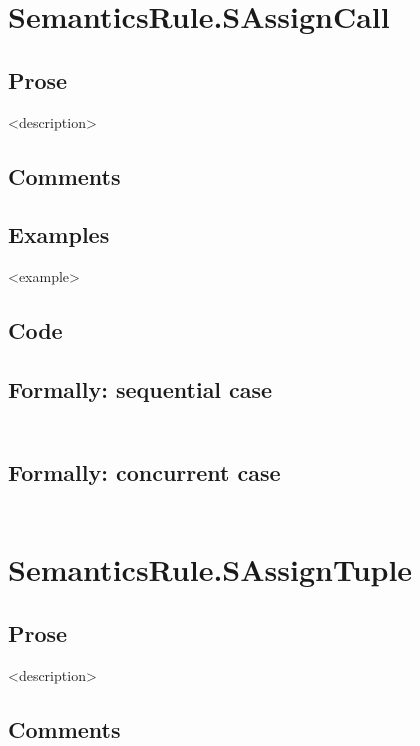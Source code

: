 \documentclass{book}
\begin{document}
\section{SemanticsRule.SAssignCall \label{sec:SemanticsRule.SAssignCall}}

    \subsection{Prose}
    <description>

    \subsection{Comments}

    \subsection{Examples}
    <example>

  \subsection{Code}

  \subsection{Formally: sequential case}
  \begin{align}
  \end{align} 

  \subsection{Formally: concurrent case}
  \begin{align}
  \end{align} 

\section{SemanticsRule.SAssignTuple \label{sec:SemanticsRule.SAssignTuple}}

    \subsection{Prose}
    <description>

    \subsection{Comments}
\end{document}
